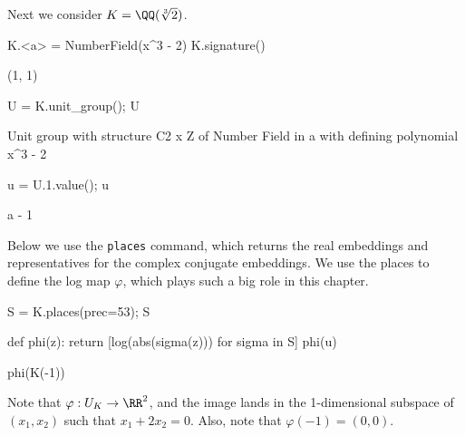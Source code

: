 Next we consider $K=\QQ(\sqrt[3]{2})$.
\begin{sagecode}
\begin{sagecell}
K.<a> = NumberField(x^3 - 2)
K.signature()
\end{sagecell}
\begin{sageout}
(1, 1)
\end{sageout}
\begin{sagecell}
U = K.unit_group(); U
\end{sagecell}
\begin{sageout}
Unit group with structure C2 x Z of Number Field in a with
defining polynomial x^3 - 2
\end{sageout}
\begin{sagecell}
\end{sagecell}
\begin{sageout}
[-1, a - 1]
\end{sageout}
\begin{sagecell}
u = U.1.value(); u
\end{sagecell}
\begin{sageout}
a - 1
\end{sageout}
\end{sagecode} %

Below we use the {\tt places} command, which returns the real embeddings
and representatives for the complex conjugate embeddings.
We use the places to define the log map $\varphi$, which plays such a big
role in this chapter.
\begin{sagecode} %
\begin{sagecell}
S = K.places(prec=53); S
\end{sagecell}
\begin{sageout}
\end{sageout}
\begin{sagecell}
def phi(z):
return [log(abs(sigma(z))) for sigma in S]
phi(u)
\end{sagecell}
\begin{sageout}
[-1.3473773483293832, 0.673688674164692]
\end{sageout}
\begin{sagecell}
phi(K(-1))
\end{sagecell}
\begin{sageout}
[0.0, 0.0]
\end{sageout}
\end{sagecode}
Note that $\varphi:U_K \to \RR^2$, and the image lands in the 1-dimensional
subspace of $(x_1,x_2)$ such that $x_1 +2x_2 = 0$.
Also, note that $\varphi(-1) = (0,0)$.

